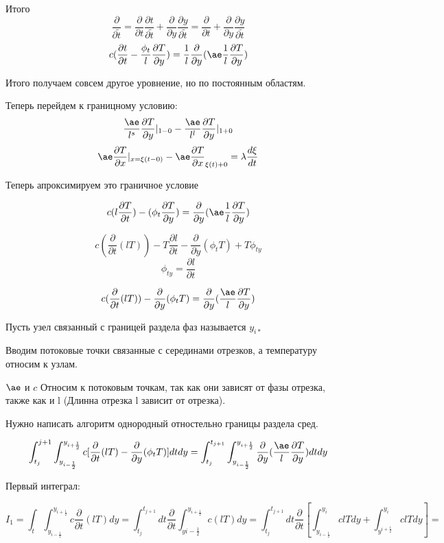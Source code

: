 \documentclass[12pt, a4paper]{article}
\begin{document}
Итого
\[ \frac{\partial }{\partial \widetilde{t}} = \frac{\partial }{\partial t} \frac{\partial t}{\partial  \widetilde{t}} + \frac{\partial }{\partial  y} \frac{\partial y}{\partial \widetilde{t}} = \frac{\partial }{\partial t} + \frac{\partial }{\partial y} \frac{\partial y}{\partial \widetilde{t}} \]
\[ c(\frac{\partial t}{\partial t} - \frac{\phi_t}{l} \frac{\partial T}{\partial y}) = \frac{1}{l} \frac{\partial }{\partial y} (\ae \frac{1}{l}\frac{\partial T}{\partial y}) \]

Итого получаем совсем другое уровнение, но по постоянным областям.

Теперь перейдем к границному условию:
\[ \frac{\ae}{l^s} \frac{\partial T}{\partial y}|_{1-0} - \frac{\ae}{l^l}\frac{\partial  T}{\partial y}|_{1+0} \]
\[\ae \frac{\partial T}{\partial x} |_{x=\xi(t-0)} - \ae \frac{\partial T}{\partial x}_{\xi(t) + 0} = \lambda \frac{d\xi}{dt} \]

Теперь апроксимируем это граничное условие

\[ c (l \frac{\partial T}{\partial t}) - (\phi_t \frac{\partial T}{\partial y}) = \frac{\partial }{\partial y}(\ae \frac{1}{l}\frac{\partial T}{\partial y}) \]

\[ c(\frac{\partial }{\partial t}(lT)) - T \frac{\partial l}{\partial t} - \frac{\partial }{\partial y} (\phi_t T) + T \phi_{ty} \]
\[ \phi_{ty} = \frac{\partial l}{\partial t} \]

\[ c(\frac{\partial }{\partial t}(lT)) - \frac{\partial }{\partial y} (\phi_t T) = \frac{\partial }{\partial y} (\frac{\ae}{l} \frac{\partial T}{\partial y}) \]

Пусть узел связанный с границей раздела фаз называется $ y_{i*} $

Вводим потоковые точки связанные с серединами отрезков, а температуру относим к узлам.

$\ae$  и  $c$ Относим к потоковым точкам, так как они зависят от фазы отрезка, также как и l (Длинна отрезка l зависит от отрезка).

Нужно написать алгоритм однородный отностельно границы раздела сред.

\[ \int_{t_j}^{j+1} \int_{y_{i-\frac{1}{2}}}^{y_{i+\frac{1}{2}}} c [\frac{\partial }{\partial t}(lT) - \frac{\partial }{\partial y}(\phi_t T)] dt dy = \int_{t_j}^{t_{j+1}} \int_{y_{i-\frac{1}{2}}}^{y_{i+\frac{1}{2}}} \frac{\partial }{\partial y} (\frac{\ae}{l}\frac{\partial T}{\partial y}) dt dy \]

Первый интеграл:

\[ I_1 = \int_{t}^{} \int_{y_{i-\frac{1}{2}}}^{y_{i+\frac{1}{2}}} c \frac{\partial}{\partial t} (lT) dy = \int_{t_j}^{t_{j+1}} dt \frac{\partial }{\partial t} \int_{y{i-\frac{1}{2}}}^{y_{i+\frac{1}{2}}} c (lT) d y = \int_{t_j}^{t_{j+1}} dt \frac{\partial }{\partial t}[\int_{y_{i-\frac{1}{2}}}^{y_i} c l T dy + \int_{y^{i+\frac{1}{2}}}^{y_{i}} clT dy ] =  \]
\end{document}
